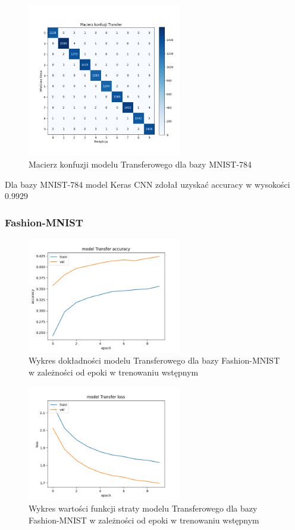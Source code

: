\documentclass{article}
\begin{document}
\begin{figure}[H]
	\centering
	\includegraphics[width=0.6\textwidth]{../Saves/Transfer/mnist-784/Transfer_mnist_784_conf_mat.png}
	\caption{Macierz konfuzji modelu Transferowego dla bazy MNIST-784}
\end{figure}
Dla bazy MNIST-784 model Keras CNN zdołał uzyskać accuracy w wysokości $0.9929$

\subsubsection{Fashion-MNIST}
\begin{figure}[H]
    \centering
    \includegraphics[width=0.6\textwidth]{../Saves/Transfer/fashion-mnist/Transfer_fashion-mnist_ep10_acc.png}
    \caption{Wykres dokładności modelu Transferowego dla bazy Fashion-MNIST w zależności od epoki w trenowaniu wstępnym}
\end{figure}

\begin{figure}[H]
    \centering
    \includegraphics[width=0.6\textwidth]{../Saves/Transfer/fashion-mnist/Transfer_fashion-mnist_ep10_loss.png}
    \caption{Wykres wartości funkcji straty modelu Transferowego dla bazy Fashion-MNIST w zależności od epoki w trenowaniu wstępnym} 
\end{figure}
\end{document}
